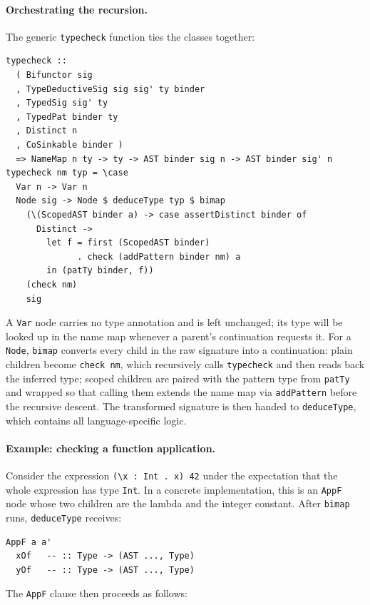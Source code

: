 \paragraph{Orchestrating the recursion.}
The generic \texttt{typecheck} function ties the classes together:

\begin{verbatim}
typecheck ::
  ( Bifunctor sig
  , TypeDeductiveSig sig sig' ty binder
  , TypedSig sig' ty
  , TypedPat binder ty
  , Distinct n
  , CoSinkable binder )
  => NameMap n ty -> ty -> AST binder sig n -> AST binder sig' n
typecheck nm typ = \case
  Var n -> Var n
  Node sig -> Node $ deduceType typ $ bimap
    (\(ScopedAST binder a) -> case assertDistinct binder of
      Distinct ->
        let f = first (ScopedAST binder)
              . check (addPattern binder nm) a
        in (patTy binder, f))
    (check nm)
    sig
\end{verbatim}

A \texttt{Var} node carries no type annotation and is left unchanged; its type will be looked up in the name map whenever a parent's continuation requests it.
For a \texttt{Node}, \texttt{bimap} converts every child in the raw signature into a continuation: plain children become \texttt{check nm}, which recursively calls \texttt{typecheck} and then reads back the inferred type; scoped children are paired with the pattern type from \texttt{patTy} and wrapped so that calling them extends the name map via \texttt{addPattern} before the recursive descent.
The transformed signature is then handed to \texttt{deduceType}, which contains all language-specific logic.

\paragraph{Example: checking a function application.}
Consider the expression \texttt{(\textbackslash x : Int . x) 42} under the expectation that the whole expression has type \texttt{Int}.
In a concrete implementation, this is an \texttt{AppF} node whose two children are the lambda and the integer constant.
After \texttt{bimap} runs, \texttt{deduceType} receives:

\begin{verbatim}
AppF a a'
  xOf   -- :: Type -> (AST ..., Type)
  yOf   -- :: Type -> (AST ..., Type)
\end{verbatim}

The \texttt{AppF} clause then proceeds as follows:

